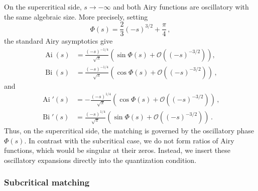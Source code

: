\documentclass[11pt]{amsart}
\numberwithin{equation}{section}
\theoremstyle{remark}
\newcommand{\mn}{\medskip\noindent}
\newcommand{\Ai}{\operatorname{Ai}}
\newcommand{\Bi}{\operatorname{Bi}}
\begin{document}
\mn
On the supercritical side, $s\to-\infty$ and both Airy functions are
oscillatory with the same algebraic size. More precisely, setting
\begin{equation}\label{phase}
\Phi(s)=\frac23(-s)^{3/2}+\frac{\pi}{4}\,,
\end{equation}
the standard Airy asymptotics \cite[Sec.~9.7]{DLMF} give
\begin{equation}\label{eq:Airy-asymptotics-minus}
	\begin{aligned}
		\Ai(s)
		&=
		\frac{(-s)^{-1/4}}{\sqrt{\pi}}
		\left(\sin\Phi(s)+\mathcal O((-s)^{-3/2})\right),\\
		\Bi(s)
		&=
		\frac{(-s)^{-1/4}}{\sqrt{\pi}}
		\left(\cos\Phi(s)+\mathcal O((-s)^{-3/2})\right)\,,
	\end{aligned}
\end{equation}
and
\begin{equation}\label{eq:Airy-derivatives-minus}
	\begin{aligned}
		\Ai'(s)
		&=
		-\frac{(-s)^{1/4}}{\sqrt{\pi}}
		\left(\cos\Phi(s)+\mathcal O((-s)^{-3/2})\right)\,,\\
		\Bi'(s)
		&=
		\frac{(-s)^{1/4}}{\sqrt{\pi}}
		\left(\sin\Phi(s)+\mathcal O((-s)^{-3/2})\right)\,.
	\end{aligned}
\end{equation}
Thus, on the supercritical side, the matching is governed by the
oscillatory phase $\Phi(s)$. In contrast with the subcritical case, we do not form ratios of Airy
functions, which would be singular at their zeros. Instead, we insert
these oscillatory expansions directly into the quantization condition.



\subsubsection{Subcritical matching}
\end{document}
